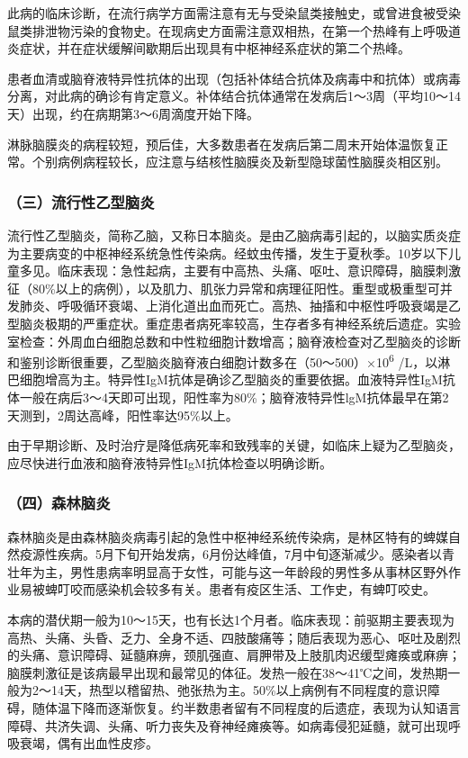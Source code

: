 此病的临床诊断，在流行病学方面需注意有无与受染鼠类接触史，或曾进食被受染鼠类排泄物污染的食物史。在现病史方面需注意双相热，在第一个热峰有上呼吸道炎症状，并在症状缓解间歇期后出现具有中枢神经系症状的第二个热峰。

患者血清或脑脊液特异性抗体的出现（包括补体结合抗体及病毒中和抗体）或病毒分离，对此病的确诊有肯定意义。补体结合抗体通常在发病后1～3周（平均10～14天）出现，约在病期第3～6周滴度开始下降。

淋脉脑膜炎的病程较短，预后佳，大多数患者在发病后第二周末开始体温恢复正常。个别病例病程较长，应注意与结核性脑膜炎及新型隐球菌性脑膜炎相区别。

\subsubsection{（三）流行性乙型脑炎}

流行性乙型脑炎，简称乙脑，又称日本脑炎。是由乙脑病毒引起的，以脑实质炎症为主要病变的中枢神经系统急性传染病。经蚊虫传播，发生于夏秋季。10岁以下儿童多见。临床表现：急性起病，主要有中高热、头痛、呕吐、意识障碍，脑膜刺激征（80\%以上的病例），以及肌力、肌张力异常和病理征阳性。重型或极重型可并发肺炎、呼吸循环衰竭、上消化道出血而死亡。高热、抽搐和中枢性呼吸衰竭是乙型脑炎极期的严重症状。重症患者病死率较高，生存者多有神经系统后遗症。实验室检查：外周血白细胞总数和中性粒细胞计数增高；脑脊液检查对乙型脑炎的诊断和鉴别诊断很重要，乙型脑炎脑脊液白细胞计数多在（50～500）×10\textsuperscript{6}
/L，以淋巴细胞增高为主。特异性IgM抗体是确诊乙型脑炎的重要依据。血液特异性IgM抗体一般在病后3～4天即可出现，阳性率为80\%；脑脊液特异性lgM抗体最早在第2天测到，2周达高峰，阳性率达95\%以上。

由于早期诊断、及时治疗是降低病死率和致残率的关键，如临床上疑为乙型脑炎，应尽快进行血液和脑脊液特异性IgM抗体检查以明确诊断。

\subsubsection{（四）森林脑炎}

森林脑炎是由森林脑炎病毒引起的急性中枢神经系统传染病，是林区特有的蜱媒自然疫源性疾病。5月下旬开始发病，6月份达峰值，7月中旬逐渐减少。感染者以青壮年为主，男性患病率明显高于女性，可能与这一年龄段的男性多从事林区野外作业易被蜱叮咬而感染机会较多有关。患者有疫区生活、工作史，有蜱叮咬史。

本病的潜伏期一般为10～15天，也有长达1个月者。临床表现：前驱期主要表现为高热、头痛、头昏、乏力、全身不适、四肢酸痛等；随后表现为恶心、呕吐及剧烈的头痛、意识障碍、延髓麻痹，颈肌强直、肩胛带及上肢肌肉迟缓型瘫痪或麻痹；脑膜刺激征是该病最早出现和最常见的体征。发热一般在38～41℃之间，发热期一般为2～14天，热型以稽留热、弛张热为主。50\%以上病例有不同程度的意识障碍，随体温下降而逐渐恢复。约半数患者留有不同程度的后遗症，表现为认知语言障碍、共济失调、头痛、听力丧失及脊神经瘫痪等。如病毒侵犯延髓，就可出现呼吸衰竭，偶有出血性皮疹。

